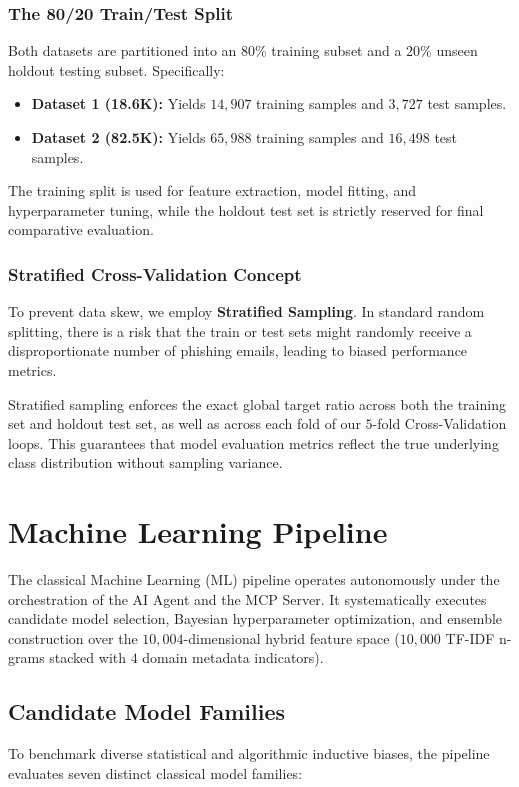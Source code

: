 \documentclass[conference]{IEEEtran}
\begin{document}
\subsubsection{The 80/20 Train/Test Split}
Both datasets are partitioned into an $80\%$ training subset and a $20\%$ unseen holdout testing subset. Specifically:
\begin{itemize}
    \item \textbf{Dataset 1 (18.6K):} Yields $14,907$ training samples and $3,727$ test samples.
    \item \textbf{Dataset 2 (82.5K):} Yields $65,988$ training samples and $16,498$ test samples.
\end{itemize}
The training split is used for feature extraction, model fitting, and hyperparameter tuning, while the holdout test set is strictly reserved for final comparative evaluation.

\subsubsection{Stratified Cross-Validation Concept}
To prevent data skew, we employ \textbf{Stratified Sampling}. In standard random splitting, there is a risk that the train or test sets might randomly receive a disproportionate number of phishing emails, leading to biased performance metrics.

Stratified sampling enforces the exact global target ratio across both the training set and holdout test set, as well as across each fold of our $5$-fold Cross-Validation loops. This guarantees that model evaluation metrics reflect the true underlying class distribution without sampling variance.


\section{Machine Learning Pipeline}
\label{sec:ml_pipeline}

The classical Machine Learning (ML) pipeline operates autonomously under the orchestration of the AI Agent and the MCP Server. It systematically executes candidate model selection, Bayesian hyperparameter optimization, and ensemble construction over the $10,004$-dimensional hybrid feature space ($10,000$ TF-IDF n-grams stacked with $4$ domain metadata indicators).

\subsection{Candidate Model Families}
To benchmark diverse statistical and algorithmic inductive biases, the pipeline evaluates seven distinct classical model families:
\end{document}
